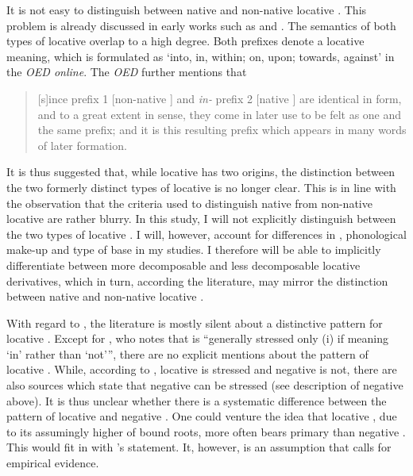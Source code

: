 It is not easy to distinguish between native and non-native locative . This problem is  already discussed in early works such as \citet[499]{Jespersen.1965} and \citet[164]{Marchand.1969}. The semantics of both types of locative  overlap to a high degree. Both prefixes denote a locative meaning, which is formulated as ‘into, in, within; on, upon; towards, against’ in the \textit{OED online}\nocite{OED.2013}. The \textit{OED} further mentions that 

\begin{quote}
[s]ince  prefix 1 [non-native ] and \textit{in-} prefix 2 [native ] are identical in form, and to a great extent in sense, they come in later use to be felt as one and the same prefix; and it is this resulting prefix which appears in many words of later formation.
\end{quote}

It is thus suggested that, while locative  has two origins, the distinction between the two formerly distinct types of locative  is no longer clear. This is in line with the observation that the criteria used to distinguish native from non-native locative  are rather blurry. 
In this study, I will not explicitly distinguish between the two types of locative . I will, however, account for differences in , phonological make-up and type of base in my studies. I therefore will be able to implicitly differentiate between more decomposable and less decomposable locative derivatives, which in turn, according the literature, may mirror the distinction between native and non-native locative .

With regard to , the literature is mostly silent about a distinctive  pattern for locative . Except for \citet[384]{Wells.2008}, who notes that  is ``generally stressed only
(i) if meaning `in' rather than `not'{''}, there are no explicit mentions about the  pattern of locative . While, according to \cite{Wells.2008}, locative  is stressed and negative  is not, there are also sources which state that negative  can be stressed (see description of negative  above). It is thus unclear whether there is a systematic difference between the  pattern of locative and negative . One could venture the idea that locative , due to its assumingly higher  of bound roots, more often bears primary  than negative . This would fit in with \citeauthor{Wells.2008}'s statement. It, however, is an assumption that calls for empirical evidence.

